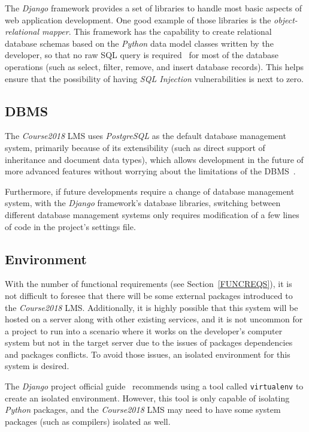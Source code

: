 The \emph{Django} framework provides a set of libraries to handle most basic
aspects of web application development. One good example of those libraries is
the \emph{object-relational mapper}. This framework has the capability to create
relational database schemas based on the \emph{Python} data model classes
written by the developer, so that no raw SQL query is required~\cite[Chapter 1]{django}
for most of the
database operations (such as select, filter, remove, and insert database
records).
This helps ensure that the possibility of having \emph{SQL Injection}
vulnerabilities is next to zero.

\subsection{DBMS}
The \emph{Course2018} LMS uses \emph{PostgreSQL} as the default database
management system, primarily because of its extensibility (such as direct
support of inheritance and document data types), which allows 
development in the future of more advanced features without worrying about the
limitations of the DBMS~\cite{postgres}.

\medskip

Furthermore, if future developments require a change of database
management system,
with the \emph{Django} framework's database libraries,
switching between different database management systems only requires
modification of a few lines of code in the project's settings file.

\subsection{Environment}
With the number of functional requirements (see Section~\ref{FUNCREQS}), it is
not difficult to foresee that there will be some external packages introduced
to the \emph{Course2018} LMS.
Additionally, it is highly possible that this system will be hosted
on a server along with other existing services, and it is not uncommon for a
project to run into a scenario where it works on the developer's computer
system but not in the target server due to the issues of packages dependencies
and packages conflicts.
To avoid those issues, an isolated environment for this system is desired.

\medskip
The \emph{Django} project official guide~\cite{BdjangoGuide} recommends using
a tool called \texttt{virtualenv} to create an isolated environment. However,
this tool is only capable of isolating \emph{Python} packages, and the
\emph{Course2018} LMS may need to have some system packages (such as
compilers) isolated as well.


